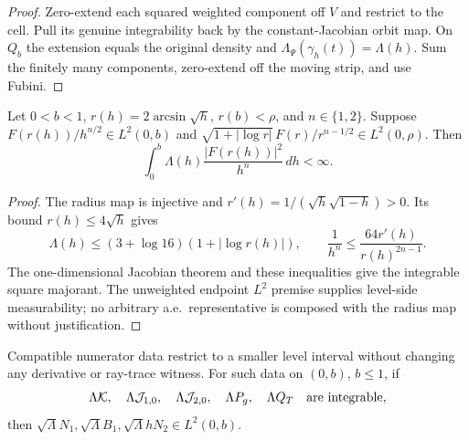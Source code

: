 \begin{proof}
\leanok
Zero-extend each squared weighted component off $V$ and restrict to the cell.
Pull its genuine integrability back by the constant-Jacobian orbit map.
On $Q_b$ the extension equals the original density and
$\Lambda_\Psi(\gamma_h(t))=\Lambda(h)$.
Sum the finitely many components, zero-extend off the moving strip, and use Fubini.
\end{proof}

\begin{lemma}
\label{lem:log-endpoint-change-variables}
\leanok
Let $0<b<1$, $r(h)=2\arcsin\sqrt h$, $r(b)<\rho$, and $n\in\{1,2\}$.
Suppose $F(r(h))/h^{n/2}\in L^2(0,b)$ and
$\sqrt{1+|\log r|}\,F(r)/r^{n-1/2}\in L^2(0,\rho)$.
Then
\[
 \int_0^b \Lambda(h)\frac{|F(r(h))|^2}{h^n}\,dh<\infty .
\]
\end{lemma}

\begin{proof}
\leanok
The radius map is injective and
$r'(h)=1/(\sqrt h\sqrt{1-h})>0$.
Its bound $r(h)\le4\sqrt h$ gives
\[
 \Lambda(h)\le(3+\log16)(1+|\log r(h)|),\qquad
 \frac1{h^n}\le\frac{64r'(h)}{r(h)^{2n-1}}.
\]
The one-dimensional Jacobian theorem and these inequalities give
the integrable square majorant. The unweighted endpoint $L^2$ premise
supplies level-side measurability; no arbitrary a.e.\ representative is
composed with the radius map without justification.
\end{proof}

\begin{lemma}
\label{lem:log-numerator-summation}
\leanok
Compatible numerator data restrict to a smaller level interval without
changing any derivative or ray-trace witness.
For such data on $(0,b)$, $b\le1$, if
\[
 \Lambda\mathcal K,\quad\Lambda\mathcal J_{1,0},\quad
 \Lambda\mathcal J_{2,0},\quad\Lambda P_g,\quad\Lambda Q_T
 \quad\hbox{are integrable},
\]
then $\sqrt\Lambda N_1,\sqrt\Lambda B_1,\sqrt\Lambda hN_2\in L^2(0,b)$.
\end{lemma}


